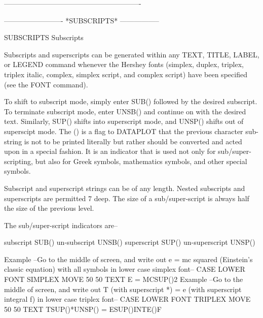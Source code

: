 ----------------------------------------------------------
 
 
 
 
 
 
 
 
 
 
 
 
 
 
 
 
 
 
 
 
 
 
 
 
 
 
 
 
 
 
 
 
 
 
 
 
-------------------------  *SUBSCRIPTS*  -----------------
 
SUBSCRIPTS
Subscripts
 
Subscripts and superscripts can be generated within any TEXT, TITLE,
LABEL, or LEGEND command whenever the Hershey fonts (simplex, duplex,
triplex, triplex italic, complex, simplex script, and complex script)
have been specified (see the FONT command).
 
To shift to subscript mode, simply enter SUB() followed by the desired
subscript.  To terminate subscript mode, enter UNSB() and continue on
with the desired text.  Similarly, SUP() shifts into superscript mode,
and UNSP() shifts out of superscipt mode.  The () is a flag to DATAPLOT
that the previous character sub-string is not to be printed literally
but rather should be converted and acted upon in a special fashion.  It
is an indicator that is used not only for sub/super-scripting, but also
for Greek symbols, mathematics symbols, and other special symbols.
 
Subscript and superscript strings can be of any length.  Nested
subscripts and superscripts are permitted 7 deep.  The size of a
sub/super-script is always half the size of the previous level.
 
The sub/super-script indicators are--
 
   subscript           SUB()
   un-subscript        UNSB()
   superscript         SUP()
   un-superscript      UNSP()
 
Example --Go to the middle of screen, and write out
             e = mc squared      (Einstein's classic equation)
          with all symbols in lower case simplex font--
             CASE LOWER
             FONT SIMPLEX
             MOVE 50 50
             TEXT E = MCSUP()2
Example --Go to the middle of screen, and write out
             T (with superscript *) = e (with superscript integral f)
          in lower case triplex font--
             CASE LOWER
             FONT TRIPLEX
             MOVE 50 50
             TEXT TSUP()*UNSP() = ESUP()INTE()F
 
